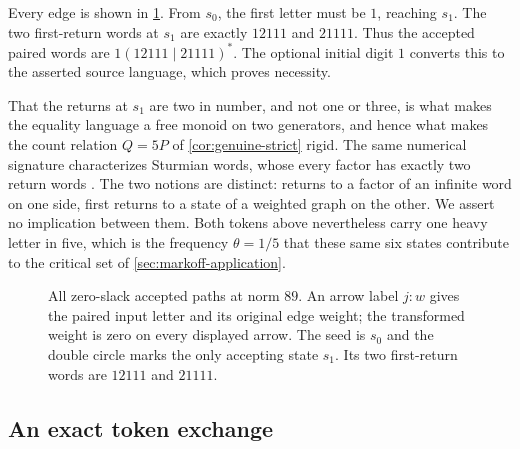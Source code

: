 Every edge is shown in \cref{fig:equality-graph}. From $s_0$, the first
letter must be $1$, reaching $s_1$. The two first-return words at $s_1$
are exactly $12111$ and $21111$. Thus the accepted paired words are
$1(12111\mid21111)^*$. The optional initial digit $1$ converts this
to the asserted source language, which proves necessity.

That the returns at $s_1$ are two in number, and not one or three, is what
makes the equality language a free monoid on two generators, and hence what
makes the count relation $Q=5P$ of \cref{cor:genuine-strict} rigid. The
same numerical signature characterizes Sturmian words, whose every factor
has exactly two return words \cite{Vuillon2001,JustinVuillon2000}. The two notions are
distinct: returns to a factor of an infinite word on one side, first
returns to a state of a weighted graph on the other. We assert no
implication between them. Both tokens above nevertheless carry one heavy
letter in five, which is the frequency $\theta=1/5$ that these same six
states contribute to the critical set of \cref{sec:markoff-application}.

\begin{figure}[tb]
\centering

\caption{All zero-slack accepted paths at norm $89$. An arrow label
$j:w$ gives the paired input letter and its original edge weight;
the transformed weight is zero on every displayed arrow.
The seed is $s_0$ and the double circle marks the only accepting state
$s_1$. Its two first-return words are $12111$ and $21111$.}
\label{fig:equality-graph}
\end{figure}

\subsection{An exact token exchange}


